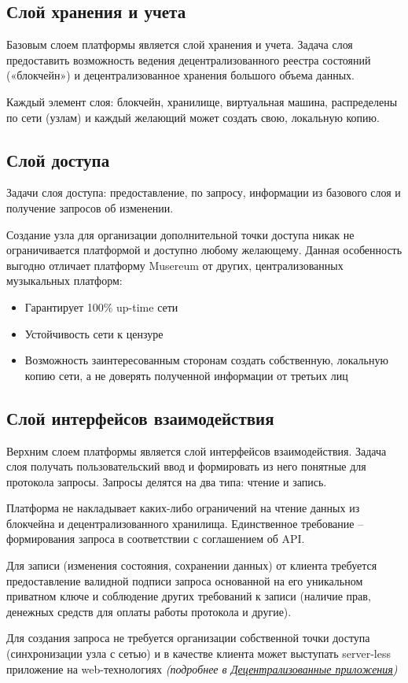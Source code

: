 \documentclass[12pt]{report}
\begin{document}
\subsection{Слой хранения и учета}
\label{tech-arch-underlayer}
\begin{multicols}{2}
Базовым слоем платформы является слой хранения и учета. Задача слоя предоставить возможность ведения децентрализованного реестра состояний («блокчейн») и децентрализованное хранения большого объема данных.

Каждый элемент слоя: блокчейн, хранилище, виртуальная машина, распределены по сети (узлам) и каждый желающий может создать свою, локальную копию. 
\end{multicols}
\subsection{Слой доступа}
\label{tech-arch-connect}
\begin{multicols}{2}
Задачи слоя доступа: предоставление, по запросу, информации из базового слоя и получение запросов об изменении.

Создание узла для организации дополнительной точки доступа никак не ограничивается платформой и доступно любому желающему. Данная особенность выгодно отличает платформу Musereum от других, централизованных музыкальных платформ:
\begin{itemize}
	\item Гарантирует 100\% up-time сети
	\item Устойчивость сети к цензуре
	\item Возможность заинтересованным сторонам создать собственную, локальную копию сети, а не доверять полученной информации от третьих лиц
\end{itemize}
\end{multicols}
\pagebreak
\subsection{Слой интерфейсов взаимодействия}
\label{tech-arch-interfaces}
\begin{multicols}{2}
Верхним слоем платформы является слой интерфейсов взаимодействия. Задача слоя получать пользовательский ввод и формировать из него понятные для протокола запросы. Запросы делятся на два типа: чтение и запись.

Платформа не накладывает каких-либо ограничений на чтение данных из блокчейна и децентрализованного хранилища. Единственное требование – формирования запроса в соответствии с соглашением об API.

Для записи (изменения состояния, сохранении данных) от клиента требуется предоставление валидной подписи запроса основанной на его уникальном приватном ключе и соблюдение других требований к записи (наличие прав, денежных средств для оплаты работы протокола и другие).

Для создания запроса не требуется организации собственной точки доступа (синхронизации узла с сетью) и в качестве клиента может выступать server-less приложение на web-технологиях \textit{(подробнее в \hyperref[tech-apps]{Децентрализованные приложения})}
\end{multicols}
\end{document}
